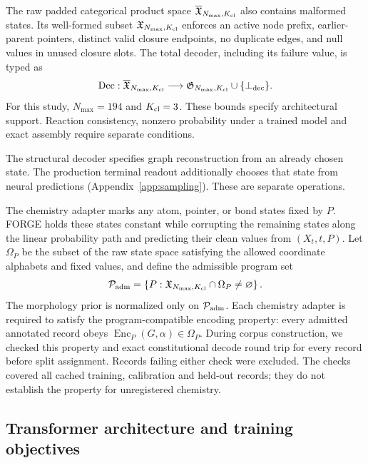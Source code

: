 \documentclass{article}
\theoremstyle{definition}
\begin{document}
The raw padded categorical product space $\overline{\mathfrak X}_{N_{\max},K_{\rm cl}}$ also
contains malformed states. Its well-formed subset $\mathfrak X_{N_{\max},K_{\rm cl}}$ enforces an
active node prefix, earlier-parent pointers, distinct valid closure endpoints, no duplicate edges,
and null values in unused closure slots. The total decoder, including its failure value, is typed as
\begin{equation}
    \operatorname{Dec}:\overline{\mathfrak X}_{N_{\max},K_{\rm cl}}
    \longrightarrow
    \mathfrak G_{N_{\max},K_{\rm cl}}\cup\{\bot_{\rm dec}\}.
\end{equation}
For this study, $N_{\max}=194$ and $K_{\rm cl}=3$.
These bounds specify architectural support. Reaction consistency, nonzero probability under a
trained model and exact assembly require separate conditions.

The structural decoder specifies graph reconstruction from an already chosen state.
The production terminal readout additionally chooses that state from neural predictions
(Appendix~\ref{app:sampling}). These are separate operations.

The chemistry adapter marks any atom, pointer, or bond states fixed by $P$.
FORGE holds these states constant while corrupting the remaining states along the linear probability
path and predicting their clean values from $(X_t,t,P)$. Let $\Omega_P$ be the subset of the raw state
space satisfying the allowed coordinate alphabets and fixed values, and define the admissible program set
\begin{equation}
    \mathcal P_{\rm adm}
    =\left\{P:\mathfrak X_{N_{\max},K_{\rm cl}}\cap\Omega_P\neq\varnothing\right\}.
\end{equation}
The morphology prior is normalized only on $\mathcal P_{\rm adm}$. Each chemistry adapter is required
to satisfy the program-compatible encoding property: every admitted annotated record obeys
$\operatorname{Enc}_P(G,\alpha)\in\Omega_P$. During corpus construction, we checked this property and exact constitutional decode round trip
for every record before split assignment. Records failing either check were excluded. The checks
covered all cached training, calibration and held-out records; they do not establish the property
for unregistered chemistry.

\subsection{Transformer architecture and training objectives}
\label{app:training}
\end{document}
